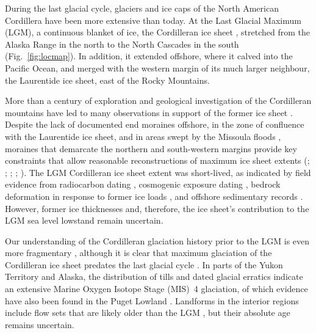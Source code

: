 \documentclass[tc]{copernicus}
\begin{document}
\introduction
\label{sec:intro}

During the last glacial cycle, glaciers and ice caps of the North American
Cordillera have been more extensive than today. At the Last Glacial
Maximum (LGM),
a continuous blanket of ice, the Cordilleran ice sheet
\citep{Dawson.1888}, stretched from the Alaska Range in the north to the
North Cascades in the south (Fig.~\ref{fig:locmap}).
In addition, it extended offshore, where it calved
into the Pacific Ocean, and merged with the western margin of its much larger
neighbour, the Laurentide ice sheet, east of the Rocky Mountains.

More than a century of exploration and geological investigation of the
Cordilleran mountains have led to many observations in support of the former
ice sheet
    \citep{Jackson.Clague.1991}.
Despite the lack of documented end moraines offshore, in the zone of confluence
with the Laurentide ice sheet, and in areas swept by the Missoula floods
    \citep{Carrara.etal.1996},
moraines that demarcate the northern and south-western margins provide key
constraints that allow reasonable reconstructions of maximum ice sheet extents
    (\citealp{Prest.etal.1968}; \citealp[Fig. 1.12]{Clague.1989};
     \citealp{Duk-Rodkin.1999};
     \citealp{Booth.etal.2003}; \citealp{Dyke.2004}).
The LGM Cordilleran ice sheet extent was short-lived, as indicated by
field evidence from radiocarbon dating
    \citep{Clague.etal.1980, Clague.1985, Clague.1986, Porter.Swanson.1998,
           Menounos.etal.2008},
cosmogenic exposure dating
    \citep{Stroeven.etal.2010, Stroeven.etal.2014, Margold.etal.2014},
bedrock deformation in response to former ice loads
    \citep{Clague.James.2002, Clague.etal.2005},
and offshore sedimentary records
    \citep{Cosma.etal.2008, Davies.etal.2011}.
However, former ice thicknesses and, therefore, the ice sheet's contribution to
the LGM sea level lowstand
    \citep{Carlson.Clark.2012, Clark.Mix.2002}
remain uncertain.

Our understanding of the Cordilleran glaciation history prior to the LGM is
even more fragmentary
    \citep{Barendregt.Irving.1998, Kleman.etal.2010, Rutter.etal.2012},
although it is clear that maximum glaciation of the Cordilleran ice sheet
predates the last glacial cycle
    \citep{Hidy.etal.2013}.
In parts of the Yukon Territory and Alaska, the distribution of tills
    \citep{Turner.etal.2013}
and dated glacial erratics
    \citep{Ward.etal.2007, Ward.etal.2008, Briner.Kaufman.2008,
           Stroeven.etal.2010, Stroeven.etal.2014}
indicate an extensive Marine Oxygen Isotope Stage (MIS)~4 glaciation, of which
evidence have also been found in the Puget Lowland \citep{Troost.2014}.
Landforms in the interior regions include flow sets that are likely
older than the LGM
    \citep[Fig.~2]{Kleman.etal.2010},
but their absolute age remains uncertain.
\end{document}
